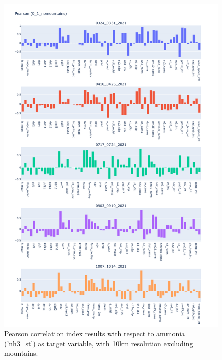 \begin{figure}[H]
    \centering
    \includegraphics[scale=0.35]{images/tests/0_1_nomountainsnh3_st_pearson.png}
    \caption{Pearson correlation index results with respect to ammonia ('nh3\_st') as target variable, with 10km resolution excluding mountains.}
    
\end{figure}
